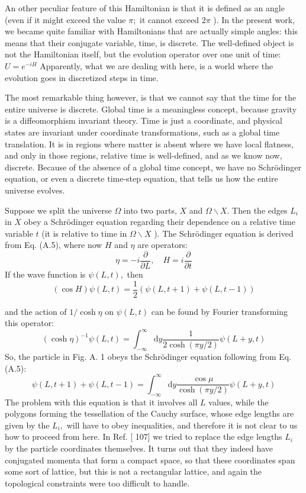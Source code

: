 \documentclass[main.tex]{subfiles}
\begin{document}
An other peculiar feature of this Hamiltonian is that it is defined as an angle (even if it might exceed the value $\pi ;$ it cannot exceed $2 \pi$ ). In the present work, we became quite familiar with Hamiltonians that are actually simple angles: this means that their conjugate variable, time, is discrete. The well-defined object is not the Hamiltonian itself, but the evolution operator over one unit of time: $U=e^{-i H}$ Apparently, what we are dealing with here, is a world where the evolution goes in discretized steps in time.

The most remarkable thing however, is that we cannot say that the time for the entire universe is discrete. Global time is a meaningless concept, because gravity is
a diffeomorphism invariant theory. Time is just a coordinate, and physical states are invariant under coordinate transformations, such as a global time translation. It is
in regions where matter is absent where we have local flatness, and only in those regions, relative time is well-defined, and as we know now, discrete. Because of the absence of a global time concept, we have no Schrödinger equation, or even a discrete time-step equation, that tells us how the entire universe evolves.

Suppose we split the universe $\Omega$ into two parts, $X$ and $\Omega \backslash X .$ Then the edges
$L_{i}$ in $X$ obey a Schrödinger equation regarding their dependence on a relative time variable $t$ (it is relative to time in $\Omega \backslash X$ ). The Schrödinger equation is derived from Eq. (A.5), where now $H$ and $\eta$ are operators:
$$
\eta=-i \frac{\partial}{\partial L}, \quad H=i \frac{\partial}{\partial t}
$$
If the wave function is $\psi(L, t),$ then
$$
(\cos H) \psi(L, t)=\frac{1}{2}(\psi(L, t+1)+\psi(L, t-1))
$$

and the action of $1 / \cosh \eta$ on $\psi(L, t)$ can be found by Fourier transforming this operator:
$$
(\cosh \eta)^{-1} \psi(L, t)=\int_{-\infty}^{\infty} \mathrm{d} y \frac{1}{2 \cosh (\pi y / 2)} \psi(L+y, t)
$$
So, the particle in Fig. A. 1 obeys the Schrödinger equation following from Eq. (A.5):
$$
\psi(L, t+1)+\psi(L, t-1)=\int_{-\infty}^{\infty} \mathrm{d} y \frac{\cos \mu}{\cosh (\pi y / 2)} \psi(L+y, t)
$$
The problem with this equation is that it involves all $L$ values, while the polygons forming the tessellation of the Cauchy surface, whose edge lengths are given by the $L_{i},$ will have to obey inequalities, and therefore it is not clear to us how to proceed from here. In Ref. [ 107] we tried to replace the edge lengths $L_{i}$ by the particle coordinates themselves. It turns out that they indeed have conjugated momenta that form a compact space, so that these coordinates span some sort of lattice, but this is not a rectangular lattice, and again the topological constraints were too difficult to handle.
\end{document}
